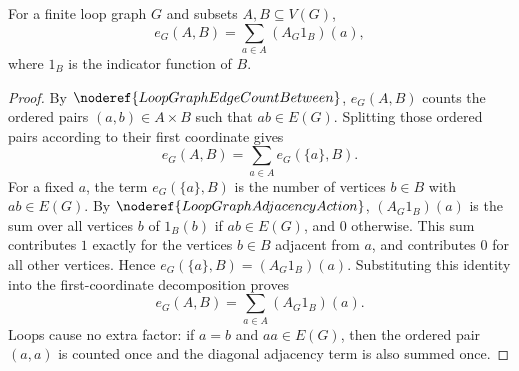 \begin{helper}
For a finite loop graph \(G\) and subsets \(A,B\subseteq V(G)\),
\[
  e_G(A,B)=\sum_{a\in A} (A_G1_B)(a),
\]
where \(1_B\) is the indicator function of \(B\).
\end{helper}
\begin{proof}
By \(\noderef{LoopGraphEdgeCountBetween}\), \(e_G(A,B)\) counts the ordered pairs \((a,b)\in A\times B\) such that \(ab\in E(G)\). Splitting those ordered pairs according to their first coordinate gives
\[
  e_G(A,B)=\sum_{a\in A} e_G(\{a\},B).
\]
For a fixed \(a\), the term \(e_G(\{a\},B)\) is the number of vertices \(b\in B\) with \(ab\in E(G)\). By \(\noderef{LoopGraphAdjacencyAction}\), \((A_G1_B)(a)\) is the sum over all vertices \(b\) of \(1_B(b)\) if \(ab\in E(G)\), and \(0\) otherwise. This sum contributes \(1\) exactly for the vertices \(b\in B\) adjacent from \(a\), and contributes \(0\) for all other vertices. Hence \(e_G(\{a\},B)=(A_G1_B)(a)\). Substituting this identity into the first-coordinate decomposition proves
\[
  e_G(A,B)=\sum_{a\in A}(A_G1_B)(a).
\]
Loops cause no extra factor: if \(a=b\) and \(aa\in E(G)\), then the ordered pair \((a,a)\) is counted once and the diagonal adjacency term is also summed once.
\end{proof}
